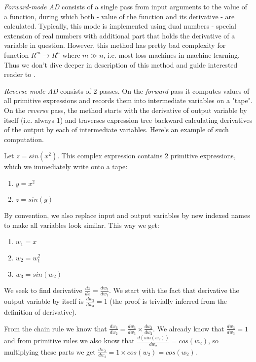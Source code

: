 \documentclass[conference]{IEEEtran}
\begin{document}
\textit{Forward-mode AD} consists of a single pass from input arguments to the value of a function, during which both - value of the function and its derivative - are calculated. Typically, this mode is implemented using dual numbers - special extension of real numbers with additional part that holds the derivative of a variable in question. However, this method has pretty bad complexity for function $R^m \to R^n$ where $m \gg n$, i.e. most loss machines in machine learning. Thus we don't dive deeper in description of this method and guide interested reader to \cite{stan}.

\textit{Reverse-mode AD} consists of 2 passes. On the \textit{forward} pass it computes values of all primitive expressions and records them into intermediate variables on a "tape". On the \textit{reverse} pass, the method starts with the derivative of output variable by itself (i.e. always $1$) and traverses expression tree backward calculating derivatives of the output by each of intermediate variables. Here's an example of such computation. 

Let $z = sin(x^2)$. This complex expression contains 2 primitive expressions, which we immediately write onto a tape:

\begin{enumerate}
\item $y = x^2$
\item $z = sin(y)$
\end{enumerate}

By convention, we also replace input and output variables by new indexed names to make all variables look similar. This way we get:

\begin{enumerate}
\item $w_1 = x$
\item $w_2 = w_1^2$
\item $w_3 = sin(w_2)$
\end{enumerate}

We seek to find derivative $\frac{dz}{dx} = \frac{dw_3}{dw_1}$. We start with the fact that derivative the output variable by itself is $\frac{dw_3}{dw_3} = 1$ (the proof is trivially inferred from the definition of derivative). 

From the chain rule we know that $\frac{dw_3}{dw_2} = \frac{dw_3}{dw_3} \times \frac{dw_3}{dw_2}$. We already know that $\frac{dw_3}{dw_3} = 1$ and from primitive rules we also know that $\frac{d(sin(w_2))}{dw_2} = cos(w_2)$, so multiplying these parts we get $\frac{dw_3}{dw_2} = 1 \times cos(w_2) = cos(w_2)$.
\end{document}

